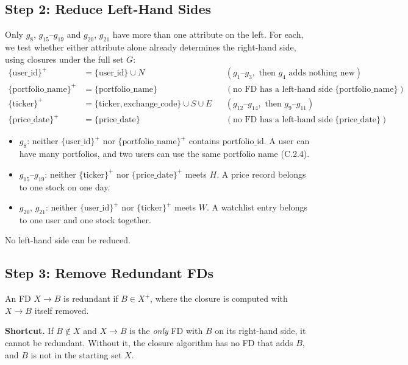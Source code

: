 \documentclass{article}
\newcommand{\at}[1]{\text{#1}}
\newcommand{\cl}[1]{\{#1\}^+}
\newcommand{\gr}[2]{g_{#1}\text{--}g_{#2}}
\begin{document}
\subsection*{Step 2: Reduce Left-Hand Sides}

Only $g_8$, $\gr{15}{19}$ and $g_{20}$, $g_{21}$ have more than one attribute on the left. For each, we test whether either attribute alone already determines the right-hand side, using closures under the full set $G$:
\begin{align*}
  \cl{\at{user\_id}} &= \{\at{user\_id}\} \cup N && (\gr{1}{3}, \text{ then } g_4 \text{ adds nothing new}) \\
  \cl{\at{portfolio\_name}} &= \{\at{portfolio\_name}\} && (\text{no FD has a left-hand side inside } \{\at{portfolio\_name}\}) \\
  \cl{\at{ticker}} &= \{\at{ticker}, \at{exchange\_code}\} \cup S \cup E && (\gr{12}{14}, \text{ then } \gr{9}{11}) \\
  \cl{\at{price\_date}} &= \{\at{price\_date}\} && (\text{no FD has a left-hand side inside } \{\at{price\_date}\})
\end{align*}
\begin{itemize}[leftmargin=*]
  \item $g_8$: neither $\cl{\at{user\_id}}$ nor $\cl{\at{portfolio\_name}}$ contains $\at{portfolio\_id}$. A user can have many portfolios, and two users can use the same portfolio name (C.2.4).
  \item $\gr{15}{19}$: neither $\cl{\at{ticker}}$ nor $\cl{\at{price\_date}}$ meets $H$. A price record belongs to one stock on one day.
  \item $g_{20}$, $g_{21}$: neither $\cl{\at{user\_id}}$ nor $\cl{\at{ticker}}$ meets $W$. A watchlist entry belongs to one user and one stock together.
\end{itemize}
No left-hand side can be reduced.

\subsection*{Step 3: Remove Redundant FDs}

An FD $X \rightarrow B$ is redundant if $B \in X^+$, where the closure is computed with $X \rightarrow B$ itself removed.

\textbf{Shortcut.} If $B \notin X$ and $X \rightarrow B$ is the \emph{only} FD with $B$ on its right-hand side, it cannot be redundant. Without it, the closure algorithm has no FD that adds $B$, and $B$ is not in the starting set $X$.
\end{document}
